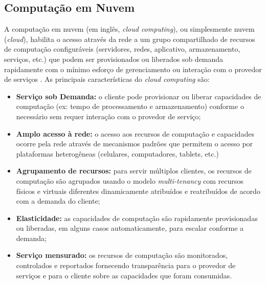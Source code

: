 \subsection{Computação em Nuvem}

A computação em nuvem (em inglês, \emph{cloud computing}), ou simplesmente nuvem
(\emph{cloud}), habilita o acesso através da rede a um grupo compartilhado de
recursos de computação configuráveis (servidores, redes, aplicativo,
armazenamento, serviços, etc.) que podem ser provisionados ou liberados sob
demanda rapidamente com o mínimo esforço de gerenciamento ou interação com o
provedor de serviços \cite{NIST2011}. As principais características do
\emph{cloud computing} são:


\begin{itemize}
    
    \item \textbf{Serviço sob Demanda:} o cliente pode provisionar ou liberar
    capacidades de computação (ex: tempo de processamento e armazenamento) conforme o
    necessário sem requer interação com o provedor de serviço;
    
    \item \textbf{Amplo acesso à rede:} o acesso aos recursos de computação e
    capacidades ocorre pela rede através de mecanismos padrões que permitem o
    acesso por plataformas heterogêneas (celulares, computadores, tablets, etc.)
      
    \item \textbf{Agrupamento de recursos:} para servir múltiplos clientes, os
    recursos de computação são agrupados usando o modelo \emph{multi-tenancy}
    com recursos físicos e virtuais diferentes dinamicamente atribuídos e
    reatribuídos de acordo com a demanda do cliente;
    
    \item \textbf{Elasticidade:} as capacidades de computação são rapidamente
    provisionadas ou liberadas, em alguns casos automaticamente, para escalar
    conforme a demanda;
    
    \item \textbf{Serviço mensurado:} os recursos de computação são monitorados,
    controlados e reportados fornecendo transparência para o provedor de
    serviços e para o cliente sobre as capacidades que foram consumidas.

\end{itemize}

